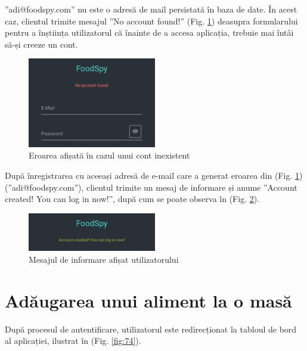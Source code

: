 ”adi@foodspy.com” nu este o adresă de mail persistată în baza de date. În acest caz, clientul trimite mesajul ”No account found!” (Fig. \ref{fig:73}) deasupra formularului pentru a înștiința utilizatorul că înainte de a accesa aplicația, trebuie mai întâi să-și creeze un cont.

\begin{figure}[!htb]
	\centering
	\includegraphics[width=0.5\textwidth]
	{../LaTeX/Images/App/auth_login_no-account.PNG}
	\caption{Eroarea afișată în cazul unui cont inexistent}
	\label{fig:73}
\end{figure}

După înregistrarea cu aceeași adresă de e-mail care a generat eroarea din (Fig. \ref{fig:73}) (”adi@foodspy.com”), clientul trimite un mesaj de informare și anume ”Account created! You can log in now!”, după cum se poate observa în (Fig. \ref{fig:747}).

\begin{figure}[!htb]
	\centering
	\includegraphics[width=0.5\textwidth]
	{../LaTeX/Images/App/auth_login_can-login.PNG}
	\caption{Mesajul de informare afișat utilizatorului}
	\label{fig:747}
\end{figure}

\section{Adăugarea unui aliment la o masă}
După procesul de autentificare, utilizatorul este redirecționat la tabloul de bord al aplicației, ilustrat în (Fig. \ref{fig:74}).

